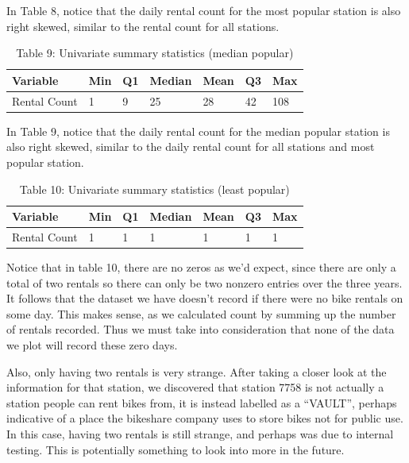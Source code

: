 \documentclass[
]{article}
\begin{document}
In Table 8, notice that the daily rental count for the most popular
station is also right skewed, similar to the rental count for all
stations.

\begin{table}[!h]

\caption{\label{tab:Table 9 univariate summary statistics (med popular)}Table 9: Univariate summary statistics (median popular)}
\centering
\begin{tabular}[t]{l|l|l|l|l|l|l}
\hline
Variable & Min & Q1 & Median & Mean & Q3 & Max\\
\hline
Rental Count & 1 & 9 & 25 & 28 & 42 & 108\\
\hline
\end{tabular}
\end{table}

In Table 9, notice that the daily rental count for the median popular
station is also right skewed, similar to the daily rental count for all
stations and most popular station.

\begin{table}[!h]

\caption{\label{tab:Table 10 univariate summary statistics (least popular)}Table 10: Univariate summary statistics (least popular)}
\centering
\begin{tabular}[t]{l|l|l|l|l|l|l}
\hline
Variable & Min & Q1 & Median & Mean & Q3 & Max\\
\hline
Rental Count & 1 & 1 & 1 & 1 & 1 & 1\\
\hline
\end{tabular}
\end{table}

Notice that in table 10, there are no zeros as we'd expect, since there
are only a total of two rentals so there can only be two nonzero entries
over the three years. It follows that the dataset we have doesn't record
if there were no bike rentals on some day. This makes sense, as we
calculated count by summing up the number of rentals recorded. Thus we
must take into consideration that none of the data we plot will record
these zero days.

Also, only having two rentals is very strange. After taking a closer
look at the information for that station, we discovered that station
7758 is not actually a station people can rent bikes from, it is instead
labelled as a ``VAULT'', perhaps indicative of a place the bikeshare
company uses to store bikes not for public use. In this case, having two
rentals is still strange, and perhaps was due to internal testing. This
is potentially something to look into more in the future.
\end{document}
